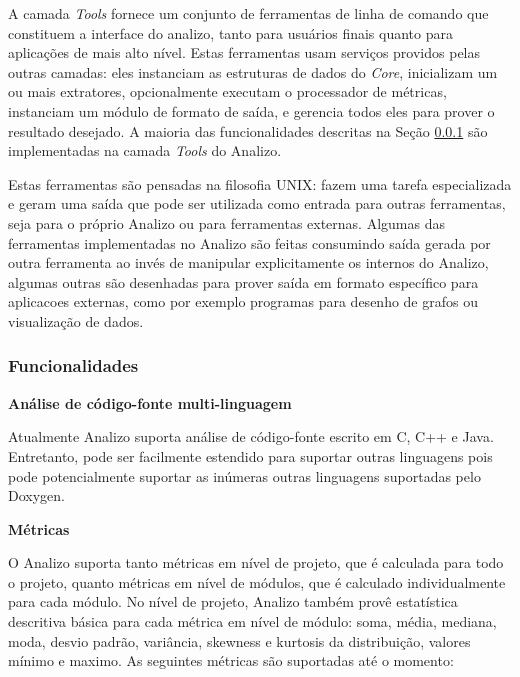 A camada {\it Tools} fornece um conjunto de ferramentas de linha de comando que
constituem a interface do analizo, tanto para usuários finais quanto para
aplicações de mais alto nível. Estas ferramentas usam serviços providos pelas
outras camadas: eles instanciam as estruturas de dados do {\it Core},
inicializam um ou mais extratores, opcionalmente executam o processador de
métricas, instanciam um módulo de formato de saída, e gerencia todos eles para
prover o resultado desejado. A maioria das funcionalidades descritas na Seção
\ref{funcionalidades} são implementadas na camada {\it Tools} do Analizo.

Estas ferramentas são pensadas na filosofia UNIX: fazem uma tarefa
especializada e geram uma saída que pode ser utilizada como entrada para outras
ferramentas, seja para o próprio Analizo ou para ferramentas externas. Algumas das
ferramentas implementadas no Analizo são feitas consumindo saída gerada por
outra ferramenta ao invés de manipular explicitamente os internos do Analizo,
algumas outras são desenhadas para prover saída em formato específico para
aplicacoes externas, como por exemplo programas para desenho de grafos ou
visualização de dados.

\subsubsection{Funcionalidades}\label{funcionalidades}

{\bf Análise de código-fonte multi-linguagem}

Atualmente Analizo suporta análise de código-fonte escrito em C, C++ e Java.
Entretanto, pode ser facilmente estendido para suportar outras linguagens pois
pode potencialmente suportar as inúmeras outras linguagens suportadas pelo Doxygen.

{\bf Métricas}\label{metricas}

O Analizo suporta tanto métricas em nível de projeto, que é calculada para todo o projeto,
quanto métricas em nível de módulos, que é calculado individualmente para cada módulo.
No nível de projeto, Analizo também provê estatística descritiva básica para cada métrica em
nível de módulo: soma, média, mediana, moda, desvio padrão, variância, skewness e kurtosis da
distribuição, valores mínimo e maximo. As seguintes métricas são suportadas até o momento:

